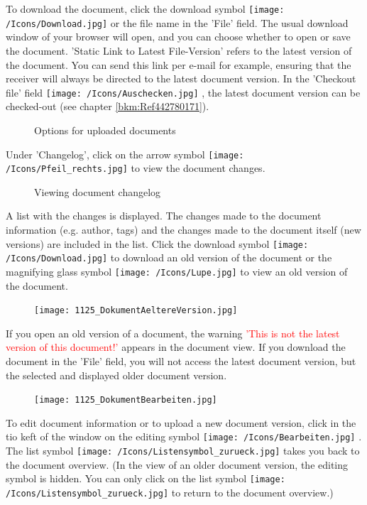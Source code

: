 To download the document, click the download symbol \texttt{[image: /Icons/Download.jpg]} or the file name  in the 'File' field. The usual download window of your browser will open, and you can choose whether to open or save the document. 'Static Link to Latest File-Version'  refers to the latest version of the document. You can send this link per e-mail for example, ensuring that the receiver will always be directed to the latest document version. In the 'Checkout file' field \texttt{[image: /Icons/Auschecken.jpg]} , the latest document version can be checked-out (see chapter \ref{bkm:Ref442780171}).

\begin{figure}[H]
\caption{Options for uploaded documents}
\end{figure}

Under 'Changelog', click on the arrow symbol \texttt{[image: /Icons/Pfeil\_rechts.jpg]}  to view the document changes.

\begin{figure}[H]
\caption{Viewing document changelog}
\end{figure}

A list with the changes is displayed. The changes made to the document information (e.g. author, tags) and the changes made to the document itself (new versions) are included in the list. Click the download symbol \texttt{[image: /Icons/Download.jpg]}  to download an old version of the document or the magnifying glass symbol \texttt{[image: /Icons/Lupe.jpg]}  to view an old version of the document. \newline

\begin{figure}
\vspace{-15pt}
\texttt{[image: 1125\_DokumentAeltereVersion.jpg]}
\end{figure}
If you open an old version of a document, the warning \textcolor{red}{'This is not the latest version of this document!'} appears in the document view. If you download the document in the 'File' field, you will not access the latest document version, but the selected and displayed older document version.

\begin{figure}
\texttt{[image: 1125\_DokumentBearbeiten.jpg]}
\end{figure}
To edit document information or to upload a new document version, click in the tio keft of the window on the editing symbol \texttt{[image: /Icons/Bearbeiten.jpg]} . The list symbol \texttt{[image: /Icons/Listensymbol\_zurueck.jpg]}  takes you back to the document overview. (In the view of an older document version, the editing symbol is hidden. You can only click on the list symbol \texttt{[image: /Icons/Listensymbol\_zurueck.jpg]} to return to the document overview.)

